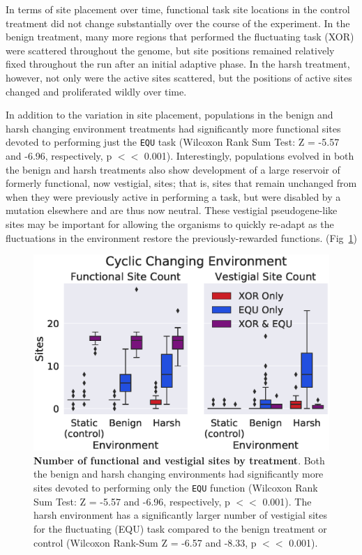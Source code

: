 \documentclass[10pt,letterpaper,final]{article}
\begin{document}
In terms of site placement over time, functional task site locations in the control treatment did not change substantially over the course of the experiment. In the benign treatment, many more regions that performed the fluctuating task (XOR) were scattered throughout the genome, but site positions remained relatively fixed throughout the run after an initial adaptive phase. In the harsh treatment, however, not only were the active sites scattered, but the positions of active sites changed and proliferated wildly over time.

In addition to the variation in site placement, populations in the benign and harsh changing environment treatments had significantly more functional sites devoted to performing just the \texttt{EQU} task (Wilcoxon Rank Sum Test: Z = -5.57 and -6.96, respectively, p $<<$ 0.001).
Interestingly, populations evolved in both the benign and harsh treatments also show development of a large reservoir of formerly functional, now vestigial, sites; that is, sites that remain unchanged from when they were previously active in performing a task, but were disabled by a mutation elsewhere and are thus now neutral. These vestigial pseudogene-like sites may be important for allowing the organisms to quickly re-adapt as the fluctuations in the environment restore the previously-rewarded functions. (Fig~\ref{fig:CCE_func_vestigial})

	\begin{figure}[!h]
	\includegraphics[width=0.95\columnwidth]{figures/CE/fig9.eps}
	\caption{\textbf{Number of functional and vestigial sites by treatment}. Both the benign and harsh changing environments had significantly more sites devoted to performing only the \texttt{EQU} function (Wilcoxon Rank Sum Test: Z = -5.57 and -6.96, respectively, p $<<$ 0.001). The harsh environment has a significantly larger number of vestigial sites for the fluctuating (EQU) task compared to the benign treatment or control (Wilcoxon Rank-Sum Z = -6.57 and -8.33, p $<<$ 0.001).
	}
	\label{fig:CCE_func_vestigial} %
	\end{figure}
\end{document}

